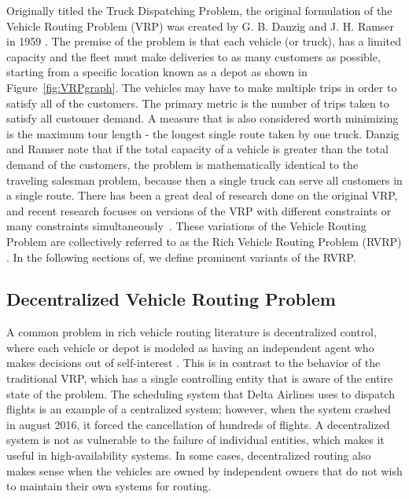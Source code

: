 \documentclass{sig-alternate}
\begin{document}
Originally titled the Truck Dispatching Problem, the original formulation of the Vehicle Routing Problem (VRP) was created by G. B. Danzig and J. H. Ramser in 1959 \cite{Danzig:1959}. The premise of the problem is that each vehicle (or truck), has a limited capacity and the fleet must make deliveries to as many customers as possible, starting from a specific location known as a depot as shown in Figure~\ref{fig:VRPgraph}. The vehicles may have to make multiple trips in order to satisfy all of the customers. The primary metric is the number of trips taken to satisfy all customer demand. A measure that is also considered worth minimizing is the maximum tour length - the longest single route taken by one truck. Danzig and Ramser note that if the total capacity of a vehicle is greater than the total demand of the customers, the problem is mathematically identical to the traveling salesman problem, because then a single truck can serve all customers in a single route. There has been a great deal of research done on the original VRP, and recent research focuses on versions of the VRP with different constraints or many constraints simultaneously~\cite{Caceres-Cruz:2014}. These variations of the Vehicle Routing Problem are collectively referred to as the Rich Vehicle Routing Problem (RVRP) . In the following sections of, we define prominent variants of the RVRP.
\subsection{Decentralized Vehicle Routing Problem}
A common problem in rich vehicle routing literature is decentralized control, where each vehicle or depot is modeled as having an independent agent who makes decisions out of self-interest \cite{Caceres-Cruz:2014}. This is in contrast to the behavior of the traditional VRP, which has a single controlling entity that is aware of the entire state of the problem. The scheduling system that Delta Airlines uses to dispatch flights is an example of a centralized system; however, when the system crashed in august 2016, it forced the cancellation of hundreds of flights. A decentralized system is not as vulnerable to the failure of individual entities, which makes it useful in high-availability systems. In some cases, decentralized routing also makes sense when the  vehicles are owned by independent owners that do not wish to maintain their own systems for routing.
\end{document}
